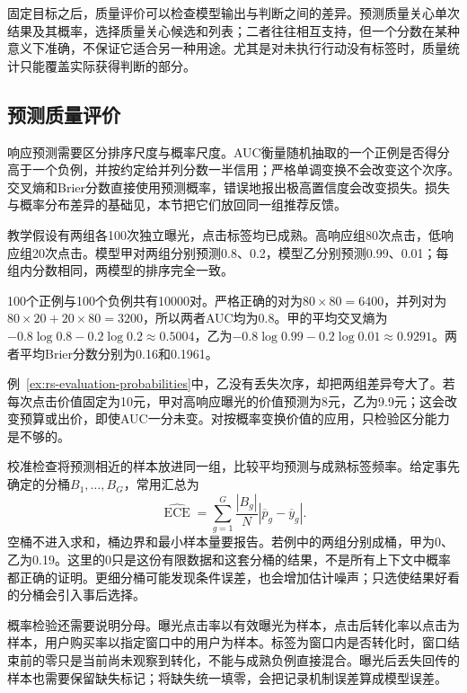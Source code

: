 固定目标之后，质量评价可以检查模型输出与判断之间的差异。预测质量关心单次结果及其概率，选择质量关心候选和列表；二者往往相互支持，但一个分数在某种意义下准确，不保证它适合另一种用途。尤其是对未执行行动没有标签时，质量统计只能覆盖实际获得判断的部分。

\subsection{预测质量评价}
\label{sec:rs-evaluation-prediction}

响应预测需要区分排序尺度与概率尺度。AUC衡量随机抽取的一个正例是否得分高于一个负例，并按约定给并列分数一半信用；严格单调变换不会改变这个次序。交叉熵和Brier分数直接使用预测概率，错误地报出极高置信度会改变损失。损失与概率分布差异的基础见，本节把它们放回同一组推荐反馈。

\begin{example}[次序相同而概率尺度不同]
\label{ex:rs-evaluation-probabilities}
教学假设有两组各100次独立曝光，点击标签均已成熟。高响应组80次点击，低响应组20次点击。模型甲对两组分别预测0.8、0.2，模型乙分别预测0.99、0.01；每组内分数相同，两模型的排序完全一致。

100个正例与100个负例共有10000对。严格正确的对为$80\times80=6400$，并列对为$80\times20+20\times80=3200$，所以两者AUC均为0.8。甲的平均交叉熵为$-0.8\log0.8-0.2\log0.2\approx0.5004$，乙为$-0.8\log0.99-0.2\log0.01\approx0.9291$。两者平均Brier分数分别为0.16和0.1961。
\end{example}

例~\ref{ex:rs-evaluation-probabilities}中，乙没有丢失次序，却把两组差异夸大了。若每次点击价值固定为10元，甲对高响应曝光的价值预测为8元，乙为9.9元；这会改变预算或出价，即使AUC一分未变。对按概率变换价值的应用，只检验区分能力是不够的。

校准检查将预测相近的样本放进同一组，比较平均预测与成熟标签频率。给定事先确定的分桶$B_1,\ldots,B_G$，常用汇总为
\begin{equation}
  \widehat{\operatorname{ECE}}
    =\sum_{g=1}^{G}\frac{|B_g|}{N}
       \left|\overline p_g-\overline y_g\right|.
  \label{eq:rs-evaluation-ece}
\end{equation}
空桶不进入求和，桶边界和最小样本量要报告。若例中的两组分别成桶，甲为0、乙为0.19。这里的0只是这份有限数据和这套分桶的结果，不是所有上下文中概率都正确的证明。更细分桶可能发现条件误差，也会增加估计噪声；只选使结果好看的分桶会引入事后选择。

概率检验还需要说明分母。曝光点击率以有效曝光为样本，点击后转化率以点击为样本，用户购买率以指定窗口中的用户为样本。标签为窗口内是否转化时，窗口结束前的零只是当前尚未观察到转化，不能与成熟负例直接混合。曝光后丢失回传的样本也需要保留缺失标记；将缺失统一填零，会把记录机制误差算成模型误差。

